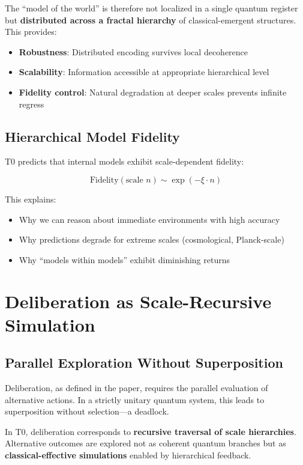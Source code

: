 	The ``model of the world'' is therefore not localized in a single quantum register but \textbf{distributed across a fractal hierarchy} of classical-emergent structures. This provides:
	
	\begin{itemize}
		\item \textbf{Robustness}: Distributed encoding survives local decoherence
		\item \textbf{Scalability}: Information accessible at appropriate hierarchical level
		\item \textbf{Fidelity control}: Natural degradation at deeper scales prevents infinite regress
	\end{itemize}
	
	\subsection{Hierarchical Model Fidelity}
	
	T0 predicts that internal models exhibit scale-dependent fidelity:
	
	\[
	\text{Fidelity}(\text{scale } n) \sim \exp\left(-\xi \cdot n\right)
	\]
	
	This explains:
	\begin{itemize}
		\item Why we can reason about immediate environments with high accuracy
		\item Why predictions degrade for extreme scales (cosmological, Planck-scale)
		\item Why ``models within models'' exhibit diminishing returns
	\end{itemize}
	
	\section{Deliberation as Scale-Recursive Simulation}
	
	\subsection{Parallel Exploration Without Superposition}
	
	Deliberation, as defined in the paper, requires the parallel evaluation of alternative actions. In a strictly unitary quantum system, this leads to superposition without selection—a deadlock.
	
	In T0, deliberation corresponds to \textbf{recursive traversal of scale hierarchies}. Alternative outcomes are explored not as coherent quantum branches but as \textbf{classical-effective simulations} enabled by hierarchical feedback.
	
